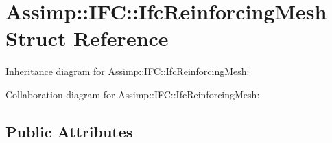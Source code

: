\hypertarget{struct_assimp_1_1_i_f_c_1_1_ifc_reinforcing_mesh}{\section{Assimp\+:\+:I\+F\+C\+:\+:Ifc\+Reinforcing\+Mesh Struct Reference}
\label{struct_assimp_1_1_i_f_c_1_1_ifc_reinforcing_mesh}
}


Inheritance diagram for Assimp\+:\+:I\+F\+C\+:\+:Ifc\+Reinforcing\+Mesh\+:


Collaboration diagram for Assimp\+:\+:I\+F\+C\+:\+:Ifc\+Reinforcing\+Mesh\+:
\subsection*{Public Attributes}
